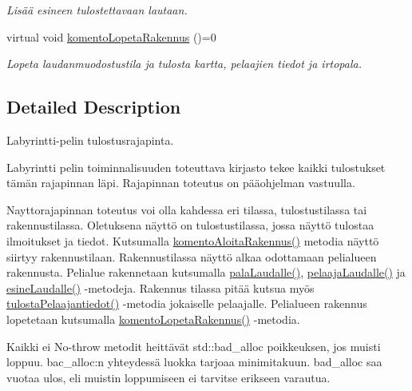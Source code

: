 \begin{DoxyCompactItemize}
\begin{DoxyCompactList}\small\item\em Lisää esineen tulostettavaan lautaan. \end{DoxyCompactList}\item 
virtual void \hyperlink{class_julkinen_1_1_nayttorajapinta_ab0fb18db1b26b45f898e0580dbbb8921}{komento\+Lopeta\+Rakennus} ()=0
\begin{DoxyCompactList}\small\item\em Lopeta laudanmuodostustila ja tulosta kartta, pelaajien tiedot ja irtopala. \end{DoxyCompactList}\end{DoxyCompactItemize}


\subsection{Detailed Description}
Labyrintti-\/pelin tulostusrajapinta. 

Labyrintti pelin toiminnalisuuden toteuttava kirjasto tekee kaikki tulostukset tämän rajapinnan läpi. Rajapinnan toteutus on pääohjelman vastuulla.

Nayttorajapinnan toteutus voi olla kahdessa eri tilassa, tulostustilassa tai rakennustilassa. Oletuksena näyttö on tulostustilassa, jossa näyttö tulostaa ilmoitukset ja tiedot. Kutsumalla \hyperlink{class_julkinen_1_1_nayttorajapinta_a1a3335dcbda7cf2fb09f5e9319c42cea}{komento\+Aloita\+Rakennus()} metodia näyttö siirtyy rakennustilaan. Rakennustilassa näyttö alkaa odottamaan pelialueen rakennusta. Pelialue rakennetaan kutsumalla \hyperlink{class_julkinen_1_1_nayttorajapinta_aef4e3badfe7fa42dcfaba7bce4299301}{pala\+Laudalle()}, \hyperlink{class_julkinen_1_1_nayttorajapinta_aa5db9bb4d55b723a2818fa0ec6ccd84a}{pelaaja\+Laudalle()} ja \hyperlink{class_julkinen_1_1_nayttorajapinta_a64f3acc155ec834b7d8661fd7b85c50a}{esine\+Laudalle()} -\/metodeja. Rakennus tilassa pitää kutsua myös \hyperlink{class_julkinen_1_1_nayttorajapinta_a22bcc0e0dc309960ad11a8bf232a87a7}{tulosta\+Pelaajantiedot()} -\/metodia jokaiselle pelaajalle. Pelialueen rakennus lopetetaan kutsumalla \hyperlink{class_julkinen_1_1_nayttorajapinta_ab0fb18db1b26b45f898e0580dbbb8921}{komento\+Lopeta\+Rakennus()} -\/metodia.

Kaikki ei No-\/throw metodit heittävät std\+::bad\+\_\+alloc poikkeuksen, jos muisti loppuu. bac\+\_\+alloc\+:n yhteydessä luokka tarjoaa minimitakuun. bad\+\_\+alloc saa vuotaa ulos, eli muistin loppumiseen ei tarvitse erikseen varautua. 

